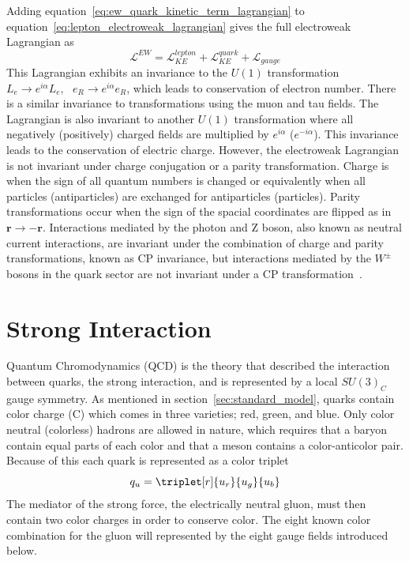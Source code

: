 Adding equation~\ref{eq:ew_quark_kinetic_term_lagrangian} to equation~\ref{eq:lepton_electroweak_lagrangian} gives the full electroweak Lagrangian as
\begin{equation}\label{eq:electroweak_lagrangian}
	\mathcal{L}^{EW}=\mathcal{L}_{KE}^{lepton}+\mathcal{L}_{KE}^{quark}+\mathcal{L}_{gauge}
\end{equation}
This Lagrangian exhibits an invariance to the $U\left(1\right)$ transformation $L_{e}{\rightarrow}e^{i\alpha}L_{e},\text{ }e_{R}{\rightarrow}e^{i\alpha}e_{R}$, which leads to conservation of electron number.
There is a similar invariance to transformations using the muon and tau fields.
The Lagrangian is also invariant to another $U\left(1\right)$ transformation where all negatively (positively) charged fields are multiplied by $e^{i\alpha}$ ($e^{-i\alpha}$).
This invariance leads to the conservation of electric charge.
However, the electroweak Lagrangian is not invariant under charge conjugation or a parity transformation.
Charge is when the sign of all quantum numbers is changed or equivalently when all particles (antiparticles) are exchanged for antiparticles (particles).
Parity transformations occur when the sign of the spacial coordinates are flipped as in $\boldsymbol{r}{\rightarrow}-\boldsymbol{r}$.
Interactions mediated by the photon and Z boson, also known as neutral current interactions, are invariant under the combination of charge and parity transformations, known as CP invariance, but interactions mediated by the $W^{\pm}$ bosons in the quark sector are not invariant under a CP transformation~\cite{Kobayashi:1973fv}.

\section{Strong Interaction}
\label{sec:strong_interaction}

Quantum Chromodynamics (QCD) is the theory that described the interaction between quarks, the strong interaction, and is represented by a local $SU\left(3\right)_{C}$ gauge symmetry.
As mentioned in section~\ref{sec:standard_model}, quarks contain color charge (C) which comes in three varieties; red, green, and blue.
Only color neutral (colorless) hadrons are allowed in nature, which requires that a baryon contain equal parts of each color and that a meson contains a color-anticolor pair.
Because of this each quark is represented as a color triplet
\begin{equation}
	q_{u}=\triplet[r]{u_{r}}{u_{g}}{u_{b}}
\end{equation}
The mediator of the strong force, the electrically neutral gluon, must then contain two color charges in order to conserve color.
The eight known color combination for the gluon will represented by the eight gauge fields introduced below.

